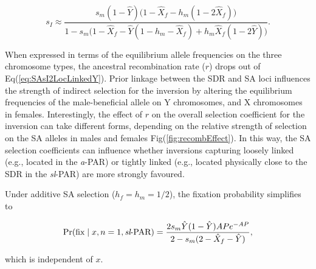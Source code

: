 \documentclass{article}
\begin{document}
\begin{equation}\label{eq:SAsI2LocLinkedY}
	s_I \approx \frac{ s_m(1 - \hat{Y}) \big( 1 - \hat{X}_f - h_m(1 - 2\hat{X}_f) \big)} { 1 - s_m \big(1 - \hat{X}_f - \hat{Y}(1 - h_m - \hat{X}_f) + h_m \hat{X}_f(1 - 2 \hat{Y}) \big) }.
\end{equation}

\noindent When expressed in terms of the equilibrium allele frequencies on the three chromosome types, the ancestral recombination rate ($r$) drops out of Eq(\ref{eq:SAsI2LocLinkedY}). Prior linkage between the SDR and SA loci influences the strength of indirect selection for the inversion by altering the equilibrium frequencies of the male-beneficial allele on Y chromosomes, and X chromosomes in females. Interestingly, the effect of $r$ on the overall selection coefficient for the inversion can take different forms, depending on the relative strength of selection on the SA alleles in males and females Fig(\ref{fig:recombEffect}). In this way, the SA selection coefficients can influence whether inversions capturing loosely linked (e.g., located in the {\itshape a}-PAR) or tightly linked (e.g., located physically close to the SDR in the {\itshape sl}-PAR) are more strongly favoured.

Under additive SA selection ($h_f = h_m = 1/2$), the fixation probability simplifies to

\begin{equation}\label{eq:SAsIpFix2LocLinked}
	\Pr(\text{fix} \mid x,n=1,\text{{\itshape sl}-PAR}) = \frac{ 2 s_m \hat{Y} (1 - \hat{Y}) A P e^{-A P}}{ 2 - s_m (2 - \hat{X}_f - \hat{Y}) },
\end{equation}

\noindent which is independent of $x$. \vspace{12pt}

\vspace{12pt}
\end{document}
